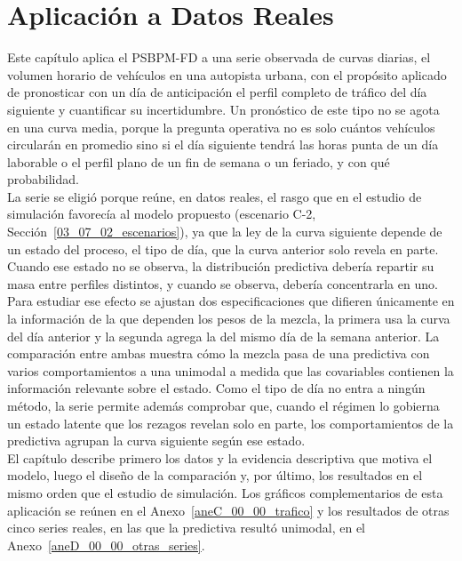 \chapter{Aplicación a Datos Reales}
\label{04_00_00_aplicacion}


Este capítulo aplica el PSBPM-FD a una serie observada de curvas diarias, el volumen horario de vehículos en una autopista urbana, con el propósito aplicado de pronosticar con un día de anticipación el perfil completo de tráfico del día siguiente y cuantificar su incertidumbre. Un pronóstico de este tipo no se agota en una curva media, porque la pregunta operativa no es solo cuántos vehículos circularán en promedio sino si el día siguiente tendrá las horas punta de un día laborable o el perfil plano de un fin de semana o un feriado, y con qué probabilidad.\\

La serie se eligió porque reúne, en datos reales, el rasgo que en el estudio de simulación favorecía al modelo propuesto (escenario C-2, Sección~\ref{03_07_02_escenarios}), ya que la ley de la curva siguiente depende de un estado del proceso, el tipo de día, que la curva anterior solo revela en parte. Cuando ese estado no se observa, la distribución predictiva debería repartir su masa entre perfiles distintos, y cuando se observa, debería concentrarla en uno. Para estudiar ese efecto se ajustan dos especificaciones que difieren únicamente en la información de la que dependen los pesos de la mezcla, la primera usa la curva del día anterior y la segunda agrega la del mismo día de la semana anterior. La comparación entre ambas muestra cómo la mezcla pasa de una predictiva con varios comportamientos a una unimodal a medida que las covariables contienen la información relevante sobre el estado. Como el tipo de día no entra a ningún método, la serie permite además comprobar que, cuando el régimen lo gobierna un estado latente que los rezagos revelan solo en parte, los comportamientos de la predictiva agrupan la curva siguiente según ese estado.\\

El capítulo describe primero los datos y la evidencia descriptiva que motiva el modelo, luego el diseño de la comparación y, por último, los resultados en el mismo orden que el estudio de simulación. Los gráficos complementarios de esta aplicación se reúnen en el Anexo~\ref{aneC_00_00_trafico} y los resultados de otras cinco series reales, en las que la predictiva resultó unimodal, en el Anexo~\ref{aneD_00_00_otras_series}.

